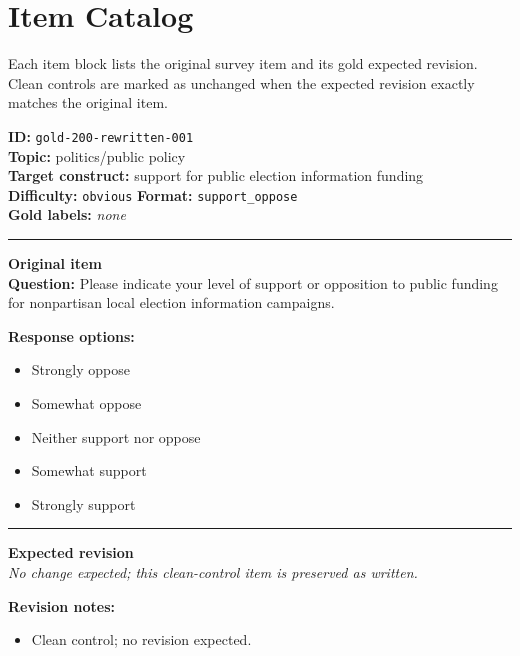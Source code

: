 \documentclass[10pt,a4paper]{article}
\newcommand{\sectionline}{\vspace{0.15em}\hrule\vspace{0.35em}}
\begin{document}
\section{Item Catalog}
Each item block lists the original survey item and its gold expected revision. Clean controls are marked as unchanged when the expected revision exactly matches the original item.
\begin{tcolorbox}[colframe=CleanGreen,colback=white,colbacktitle=CleanGreen!9,coltitle=black,title={Item 001\hfill Clean control}]
\textbf{ID:} \texttt{gold-200-rewritten-001}\\
\textbf{Topic:} politics/public policy\\
\textbf{Target construct:} support for public election information funding\\
\textbf{Difficulty:} \texttt{obvious} \quad \textbf{Format:} \texttt{support\_oppose}\\
\textbf{Gold labels:} \textit{none}\\
\sectionline
\textbf{Original item}\\
\textbf{Question:} Please indicate your level of support or opposition to public funding for nonpartisan local election information campaigns.
\par\textbf{Response options:}
\begin{itemize}
\item Strongly oppose
\item Somewhat oppose
\item Neither support nor oppose
\item Somewhat support
\item Strongly support
\end{itemize}
\sectionline
\textbf{Expected revision}\\
\textit{No change expected; this clean-control item is preserved as written.}
\par\textbf{Revision notes:}
\begin{itemize}
\item Clean control; no revision expected.
\end{itemize}
\end{tcolorbox}
\end{document}
